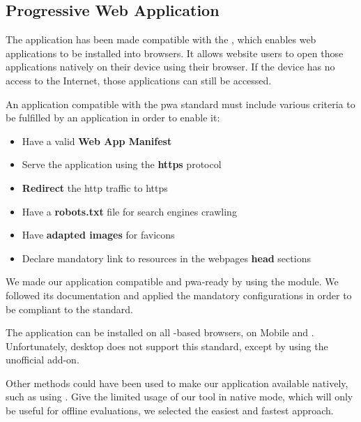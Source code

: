 \subsection{Progressive Web Application}
\label{subsec:app_implementation_pwa}

The application has been made compatible with the , which enables web applications to be installed into browsers. It allows website users to open those applications natively on their device using their browser. If the device has no access to the Internet, those applications can still be accessed.

An application compatible with the \gls{pwa} standard must include various criteria to be fulfilled by an application in order to enable it:
\begin{itemize}
	\item Have a valid \textbf{Web App Manifest}
	\item Serve the application using the \textbf{\gls{https}} protocol
	\item \textbf{Redirect} the \gls{http} traffic to \gls{https}
	\item Have a \textbf{robots.txt} file for search engines crawling
	\item Have \textbf{adapted images} for favicons
	\item Declare mandatory link to resources in the webpages \textbf{head} sections
\end{itemize}

We made our application compatible and \gls{pwa}-ready by using the  module. We followed its documentation and applied the mandatory configurations in order to be compliant to the standard.

The application can be installed on all -based browsers, on  Mobile and . Unfortunately,  desktop does not support this standard, except by using the unofficial  add-on.

Other methods could have been used to make our application available natively, such as using . Give the limited usage of our tool in native mode, which will only be useful for offline evaluations, we selected the easiest and fastest approach.

